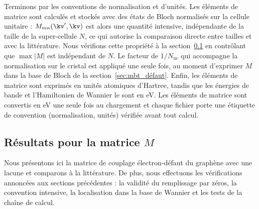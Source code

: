 Terminons par les conventions de normalisation et d'unités. Les éléments de matrice sont calculés et stockés avec des états de Bloch normalisés sur la cellule unitaire : $M_{mn}(\kv',\kv)$ est alors une quantité intensive, indépendante de la taille de la super-cellule $N$, ce qui autorise la comparaison directe entre tailles et avec la littérature. Nous vérifions cette propriété à la section~\ref{sec:M_results} en contrôlant que $\max|M|$ est indépendant de $N$. Le facteur de $1/N_\text{uc}$ qui accompagne la normalisation sur le cristal est appliqué une seule fois, au moment d'exprimer $M$ dans la base de Bloch de la section~\ref{sec:mbt_défaut}. Enfin, les éléments de matrice sont exprimés en unités atomiques d'Hartree, tandis que les énergies de bande et l'Hamiltonien de Wannier le sont en eV. Les éléments de matrice sont convertis en eV une seule fois au chargement et chaque fichier porte une étiquette de convention (normalisation, unités) vérifiée avant tout calcul.

\subsection{Résultats pour la matrice $M$}\label{sec:M_results}

Nous présentons ici la matrice de couplage électron-défaut du graphène avec une lacune et comparons à la littérature. De plus, nous effectuons les vérifications annoncées aux sections précédentes : la validité du remplissage par zéros, la convention intensive, la localisation dans la base de Wannier et les tests de la chaîne de calcul.


